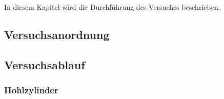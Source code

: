 In diesem Kapitel wird die Durchf\"uhrung des Versuches beschrieben.


\subsection{Versuchsanordnung}
\label{sec:durchf:subsec:anordn}



\subsection{Versuchsablauf}
\label{sec:durchf:subsec:ablauf}


\subsubsection{Hohlzylinder}


